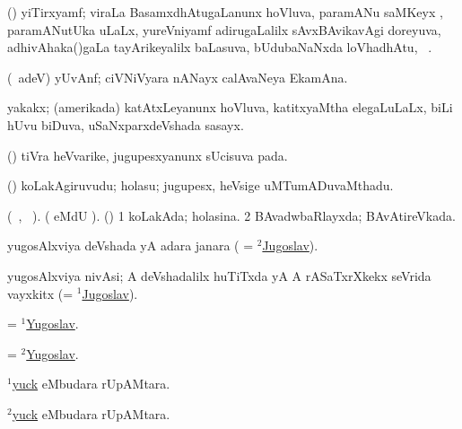 \bentry
{} 
\gl{\nA} 
\bmng
(\ravi) yiTirxyamf; viraLa BasamxdhAtugaLanunx hoVluva, paramANu saMKeyx , paramANutUka  uLaLx,  yureVniyamf adirugaLalilx sAvxBAvikavAgi doreyuva, adhivAhaka()gaLa tayArikeyalilx baLasuva, bUdubaNaNxda loVhadhAtu, \saMkeV\ .
\emng
\eentry

\bentry
{} 
\gl{\nA} 
\bmng
(\bava\ adeV) yUvAnf; 
ciVNiVyara nANayx calAvaNeya EkamAna.
\emng
\eentry

\bentry
{} 
\gl{\nA} 
\bmng
yakakx; (amerikada) katAtxLeyanunx hoVluva, katitxyaMtha elegaLuLaLx, biLi hUvu biDuva, uSaNxparxdeVshada sasayx. 
\emng
\eentry

\bentry
{} 
\gl{\BAavayx}   
\bmng
(\ashi) tiVra heVvarike, jugupesxyanunx sUcisuva pada.
\emng
\eentry

\bentry
{} 
\gl{\nA}  
\bmng
(\ashi) koLakAgiruvudu; holasu; jugupesx, heVsige uMTumADuvaMthadu.
\emng
\eentry

\bentry
{} 
\gl{\gu} 
\bmng
(\tara\ , \tama\ ).
(  eMdU \parx).  (\ashi) 
\bnum
\num{1} koLakAda; holasina. 
\num{2} BAvadwbaRlayxda; BAvAtireVkada.
\enum
\emng
\eentry

\bentry
{} 
\gl{\gu} 
\bmng
yugosAlxviya deVshada yA adara janara ( = \hyperref{kandict_j.pdf}{J}{Jugoslav(2)}{$^2$Jugoslav}).
\emng
\eentry

\bentry
{} 
\gl{\nA} 
\bmng
yugosAlxviya nivAsi; A deVshadalilx huTiTxda yA A rASaTxrXkekx seVrida vayxkitx (= \hyperref{kandict_j.pdf}{J}{Jugoslav(1)}{$^1$Jugoslav}).
\emng
\eentry

\bentry
{} 
\gl{\gu} 
\bmng
= \hyperlink{Yugoslav(1)}{$^1$Yugoslav}.
\emng
\eentry

\bentry
{} 
\gl{\nA} 
\bmng
= \hyperlink{Yugoslav(2)}{$^2$Yugoslav}.
\emng
\eentry

\bentry
{} 
\gl{\BAavayx} 
\bmng
\hyperlink{yuck(1)}{$^1$yuck} eMbudara rUpAMtara.
\emng 
\eentry

\bentry
{} 
\gl{\nA} 
\bmng
\hyperlink{yuck(2)}{$^2$yuck} eMbudara rUpAMtara.
\emng 
\eentry

